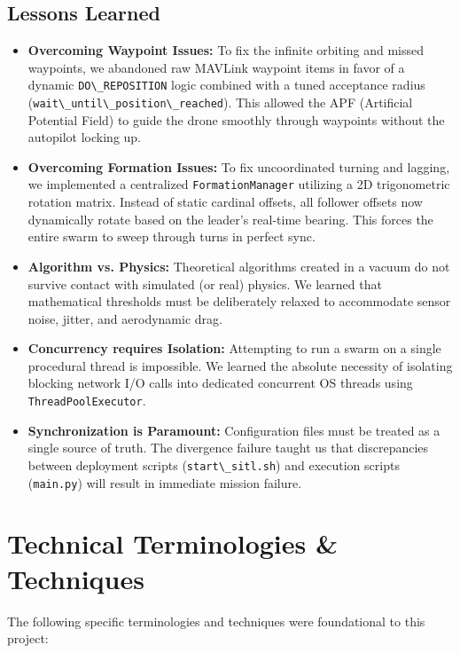 \documentclass[11pt,a4paper]{article}
\newcommand{\code}[1]{\lstinline[basicstyle=\ttfamily\small,columns=fullflexible]|#1|}
\begin{document}
\subsection{Lessons Learned}
\begin{itemize}[leftmargin=1.5em]
    \item \textbf{Overcoming Waypoint Issues:} To fix the infinite orbiting and missed waypoints, we abandoned raw MAVLink waypoint items in favor of a dynamic \code{DO\_REPOSITION} logic combined with a tuned acceptance radius (\code{wait\_until\_position\_reached}). This allowed the APF (Artificial Potential Field) to guide the drone smoothly through waypoints without the autopilot locking up.
    \item \textbf{Overcoming Formation Issues:} To fix uncoordinated turning and lagging, we implemented a centralized \code{FormationManager} utilizing a 2D trigonometric rotation matrix. Instead of static cardinal offsets, all follower offsets now dynamically rotate based on the leader's real-time bearing. This forces the entire swarm to sweep through turns in perfect sync.
    \item \textbf{Algorithm vs. Physics:} Theoretical algorithms created in a vacuum do not survive contact with simulated (or real) physics. We learned that mathematical thresholds must be deliberately relaxed to accommodate sensor noise, jitter, and aerodynamic drag.
    \item \textbf{Concurrency requires Isolation:} Attempting to run a swarm on a single procedural thread is impossible. We learned the absolute necessity of isolating blocking network I/O calls into dedicated concurrent OS threads using \code{ThreadPoolExecutor}.
    \item \textbf{Synchronization is Paramount:} Configuration files must be treated as a single source of truth. The divergence failure taught us that discrepancies between deployment scripts (\code{start\_sitl.sh}) and execution scripts (\code{main.py}) will result in immediate mission failure.
\end{itemize}

\section{Technical Terminologies \& Techniques}
The following specific terminologies and techniques were foundational to this project:
\end{document}
